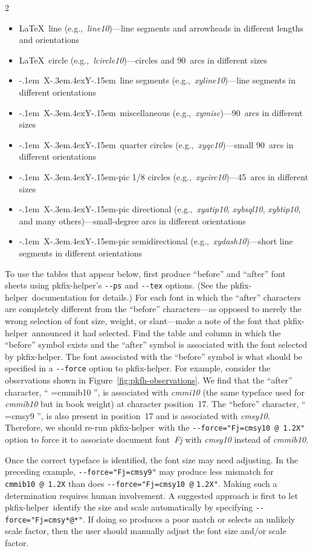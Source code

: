 \documentclass{article}
\newcommand{\infont}[2]{{%
  \font\samplefont=#1\samplefont
  #2%
}}%
\newcommand*{\pkfh}{\mbox{\textsf{pkfix-helper}}}
\newcommand*{\fname}[1]{\mbox{\textit{#1}}}
\newcommand*{\Xy}{\mbox{\kern-.1em X\kern-.3em\lower.4ex\hbox{Y\kern-.15em}}}
\begin{document}
\begin{multicols}{2}
\begin{itemize}
  \item \LaTeX\ line (e.g.,~\fname{line10})---line segments and arrowheads
    in different lengths and orientations
  \item \LaTeX\ circle (e.g.,~\fname{lcircle10})---circles and
    90\textdegree\ arcs in different sizes
  \item \Xy\ line segments (e.g.,~\fname{xyline10})---line segments
    in different orientations
  \item \Xy\ miscellaneous (e.g.,~\fname{xymisc})---90\textdegree\
    arcs in different sizes
  \item \Xy\ quarter circles (e.g.,~\fname{xyqc10})---small 90\textdegree\
    arcs in different orientations
  \item \Xy-pic 1/8 circles (e.g.,~\fname{xycirc10})---45\textdegree\
    arcs in different sizes
  \item \Xy-pic directional (e.g.,~\fname{xyatip10}, \fname{xybsql10},
    \fname{xybtip10}, and many others)---small-degree arcs in different
    orientations
  \item \Xy-pic semidirectional (e.g.,~\fname{xydash10})---short line
    segments in different orientations
\end{itemize}

To use the tables that appear below, first produce ``before'' and
``after'' font sheets using \pkfh's \verb|--ps| and \verb|--tex|
options.  (See the \pkfh\ documentation for details.)  For each font
in which the ``after'' characters are completely different from the
``before'' characters---as opposed to merely the wrong selection of
font size, weight, or slant---make a note of the font that \pkfh\
announced it had selected.  Find the table and column in which the
``before'' symbol exists and the ``after'' symbol is associated with
the font selected by \pkfh.  The font associated with the ``before''
symbol is what should be specified in a \verb|--force| option to
\pkfh.  For example, consider the observations shown in
Figure~\ref{fig:pkfh-observations}.  We find that the ``after''
character, ``\infont{cmmib10}{\char17}'', is associated with
\fname{cmmi10} (the same typeface used for \fname{cmmib10} but in book
weight) at character position~17.  The ``before'' character,
``\infont{cmsy9}{\char17}'', is also present in position~17 and is
associated with \fname{cmsy10}.  Therefore, we should re-run \pkfh\
with the \verb|--force="Fj=cmsy10 @ 1.2X"| option to force it to
associate document font~\fname{Fj} with \fname{cmsy10} instead of
\fname{cmmib10}.

Once the correct typeface is identified, the font size may need
adjusting.  In the preceding example, \verb|--force="Fj=cmsy9"| may
produce less mismatch for \texttt{cmmib10~@ 1.2X} than does
\verb|--force="Fj=cmsy10 @| \verb|1.2X"|.  Making such a determination
requires human involvement.  A suggested approach is first to let
\pkfh\ identify the size and scale automatically by specifying
\verb|--force="Fj=cmsy*@*"|.  If doing so produces a poor match or
selects an unlikely scale factor, then the user should manually adjust
the font size and/or scale factor.  \end{multicols}
\end{document}
